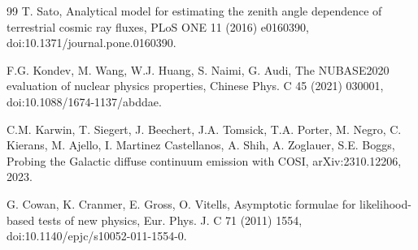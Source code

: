 \documentclass[11pt]{article}
\begin{document}
\begin{thebibliography}{99}
T. Sato, Analytical model for estimating the zenith angle dependence of terrestrial cosmic ray fluxes, PLoS ONE 11 (2016) e0160390, doi:10.1371/journal.pone.0160390.

F.G. Kondev, M. Wang, W.J. Huang, S. Naimi, G. Audi, The NUBASE2020 evaluation of nuclear physics properties, Chinese Phys. C 45 (2021) 030001, doi:10.1088/1674-1137/abddae.

C.M. Karwin, T. Siegert, J. Beechert, J.A. Tomsick, T.A. Porter, M. Negro, C. Kierans, M. Ajello, I. Martinez Castellanos, A. Shih, A. Zoglauer, S.E. Boggs, Probing the Galactic diffuse continuum emission with COSI, arXiv:2310.12206, 2023.

G. Cowan, K. Cranmer, E. Gross, O. Vitells, Asymptotic formulae for likelihood-based tests of new physics, Eur. Phys. J. C 71 (2011) 1554, doi:10.1140/epjc/s10052-011-1554-0.

\end{thebibliography}
\end{document}
